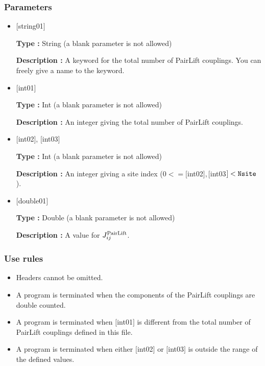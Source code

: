 \subsubsection{Parameters}
 \begin{itemize}

 \item  $[$string01$]$
   
    {\bf Type :} String (a blank parameter is not allowed)

   {\bf Description :}  A keyword for the total number of PairLift couplings. You can freely give a name to the keyword.

   \item  $[$int01$]$
   
    {\bf Type :} Int (a blank parameter is not allowed)

   {\bf Description :} An integer giving the total number of PairLift couplings.

  \item  $[$int02$]$, $[$int03$]$
  
 {\bf Type :} Int (a blank parameter is not allowed)

{\bf Description :} An integer giving a site index ($0<= [$int02$], [$int03$]<\verb|Nsite|$).
 
 \item  $[$double01$]$
   
   {\bf Type :} Double (a blank parameter is not allowed)

  {\bf Description :}  A value for $J_{ij}^{\rm PairLift}$.
    
\end{itemize}

\subsubsection{Use rules}
\begin{itemize}
\item Headers cannot be omitted. 
\item A program is terminated when the components of the PairLift couplings are double counted.
\item A program is terminated when $[$int01$]$ is different from the total number of PairLift couplings defined in this file.
\item A program is terminated when either $[$int02$]$ or $[$int03$]$ is outside the range of the defined values.
\end{itemize}

\newpage
